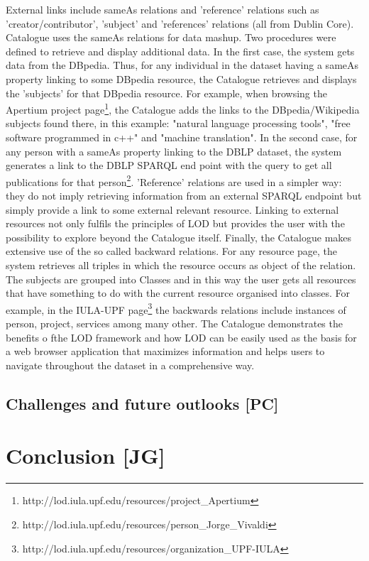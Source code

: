 \documentclass{llncs}
\begin{document}
{External links include sameAs relations and 'reference' relations such as 'creator/contributor', 'subject' and 'references' relations (all from Dublin Core). Catalogue uses the sameAs relations for data mashup. Two procedures were defined to retrieve and display additional data. In the first case, the system gets data from the DBpedia. Thus, for any individual in the dataset having a sameAs property linking to some DBpedia resource, the Catalogue retrieves and displays the 'subjects' for that DBpedia resource. For example, when browsing the Apertium project page\footnote{http://lod.iula.upf.edu/resources/project\_Apertium}, the Catalogue adds the links to the DBpedia/Wikipedia subjects found there, in this example: "natural language processing tools", "free software programmed in c++" and "machine translation". In the second case, for any person with a sameAs property linking to the DBLP dataset, the system generates a link to the DBLP SPARQL end point with the query to get all publications for that person\footnote{http://lod.iula.upf.edu/resources/person\_Jorge\_Vivaldi}. 'Reference' relations are used in a simpler way: they do not imply retrieving information from an external SPARQL endpoint but simply provide a link to some external relevant resource. Linking to external resources not only fulfils the principles of LOD but provides the user with the possibility to explore beyond the Catalogue itself.
Finally, the Catalogue makes extensive use of the so called backward relations. For any resource page, the system retrieves all triples in which the resource occurs as object of the relation. The subjects are grouped into Classes and in this way the user gets all resources that have something to do with the current resource organised into classes. For example, in the IULA-UPF page\footnote{http://lod.iula.upf.edu/resources/organization\_UPF-IULA} the backwards relations include instances of person, project, services among many other.
The Catalogue demonstrates the benefits o fthe LOD framework and how LOD can be easily used as the basis for a web browser application that maximizes information and helps users to navigate throughout the dataset in a comprehensive way.
\subsection{Challenges and future outlooks [PC]}
\label{sec:challenges}
\section{Conclusion [JG]}
\label{sec:conclusion}
}
\end{document}
